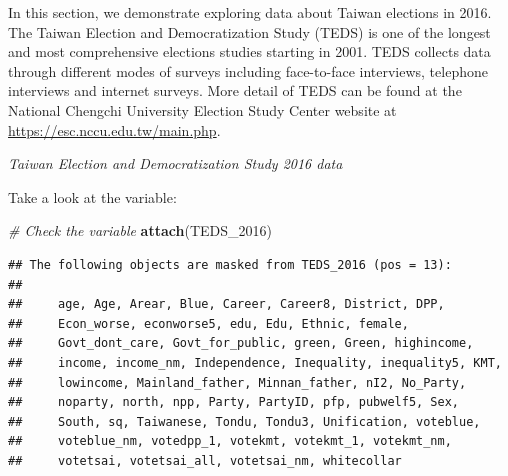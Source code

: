 \documentclass[]{book}
\newenvironment{Shaded}{\begin{snugshade}}{\end{snugshade}}
\newcommand{\CommentTok}[1]{\textcolor[rgb]{0.56,0.35,0.01}{\textit{#1}}}
\newcommand{\DataTypeTok}[1]{\textcolor[rgb]{0.13,0.29,0.53}{#1}}
\newcommand{\DecValTok}[1]{\textcolor[rgb]{0.00,0.00,0.81}{#1}}
\newcommand{\KeywordTok}[1]{\textcolor[rgb]{0.13,0.29,0.53}{\textbf{#1}}}
\newcommand{\NormalTok}[1]{#1}
\newcommand{\OperatorTok}[1]{\textcolor[rgb]{0.81,0.36,0.00}{\textbf{#1}}}
\newcommand{\StringTok}[1]{\textcolor[rgb]{0.31,0.60,0.02}{#1}}
\begin{document}
In this section, we demonstrate exploring data about Taiwan elections in 2016. The Taiwan Election and Democratization Study (TEDS) is one of the longest and most comprehensive elections studies starting in 2001. TEDS collects data through different modes of surveys including face-to-face interviews, telephone interviews and internet surveys. More detail of TEDS can be found at the National Chengchi University Election Study Center website at \url{https://esc.nccu.edu.tw/main.php}.

\emph{Taiwan Election and Democratization Study 2016 data}

\begin{Shaded}
\end{Shaded}

Take a look at the variable:

\begin{Shaded}
\begin{Highlighting}[]
\CommentTok{# Check the variable}
\KeywordTok{attach}\NormalTok{(TEDS_}\DecValTok{2016}\NormalTok{)}
\end{Highlighting}
\end{Shaded}

\begin{verbatim}
## The following objects are masked from TEDS_2016 (pos = 13):
## 
##     age, Age, Arear, Blue, Career, Career8, District, DPP,
##     Econ_worse, econworse5, edu, Edu, Ethnic, female,
##     Govt_dont_care, Govt_for_public, green, Green, highincome,
##     income, income_nm, Independence, Inequality, inequality5, KMT,
##     lowincome, Mainland_father, Minnan_father, nI2, No_Party,
##     noparty, north, npp, Party, PartyID, pfp, pubwelf5, Sex,
##     South, sq, Taiwanese, Tondu, Tondu3, Unification, voteblue,
##     voteblue_nm, votedpp_1, votekmt, votekmt_1, votekmt_nm,
##     votetsai, votetsai_all, votetsai_nm, whitecollar
\end{verbatim}
\end{document}
